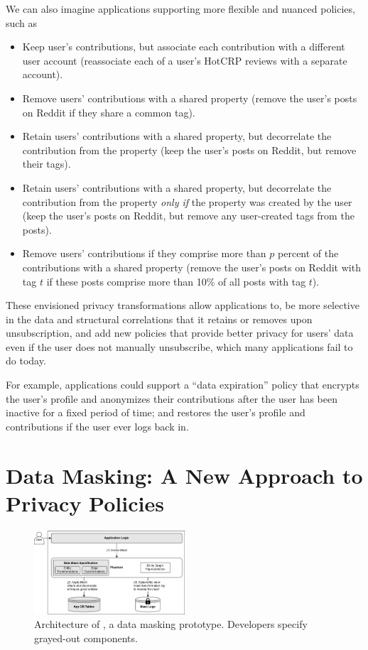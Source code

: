 We can also imagine applications supporting more flexible and nuanced policies, such as
\begin{itemize}[nosep]
    \item Keep user's contributions, but associate each contribution with a different user account
        (\eg reassociate each of a user's HotCRP reviews with a separate account).
    \item Remove users' contributions with a shared property (\eg remove the user's
       posts on Reddit if they share a common tag).
    \item Retain users' contributions with a shared property, but decorrelate the contribution
        from the property (\eg keep the user's posts on Reddit, but remove their tags).
    \item Retain users' contributions with a shared property, but decorrelate the contribution
        from the property \emph{only if} the property was created by
        the user (\eg keep the user's posts on Reddit, but remove any user-created tags from the posts).
    \item Remove users' contributions if they comprise more than $p$ percent of the contributions
        with a shared property (\eg remove the user's posts on Reddit with tag $t$ if
        these posts comprise more than 10\% of all posts with tag $t$).
\end{itemize}

These envisioned privacy transformations allow applications to, \eg be more selective in the data and structural
correlations that it retains or removes upon unsubscription, and add new policies that provide
better privacy for users' data even if the user does not manually unsubscribe, which many applications
fail to do today.

For example, applications could support a ``data expiration'' policy that encrypts the user's
profile and anonymizes their contributions after the user has been inactive for a fixed period of
time; and restores the user's profile and contributions if the user ever logs back in.

\section{Data Masking: A New Approach to Privacy Policies}
\begin{figure}[t!]
    \centering
    \includegraphics[width=0.5\textwidth]{img/impl}

    \caption{Architecture of \sys, a data masking prototype. Developers specify grayed-out components.}
    \label{fig:arch}
\end{figure}

